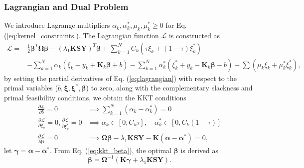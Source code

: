 \documentclass[a4paper]{cas-sc}
\begin{document}
\subsubsection{Lagrangian and Dual Problem}
We introduce Lagrange multipliers $\alpha_k, \alpha_k^*, \mu_k, \mu_k^* \ge 0$ for Eq. (\ref{eq:kernel_constraints}). The Lagrangian function $\mathcal{L}$ is constructed as
\begin{equation}
\label{eq:lagrangian}
\begin{aligned}
\mathcal{L} = &\frac{1}{2} \boldsymbol{\beta}^T \boldsymbol{\Omega} \boldsymbol{\beta} - (\lambda_1 \boldsymbol{K} \mathbf{S} \boldsymbol{Y})^T \boldsymbol{\beta} + \sum_{k=1}^N C_k (\tau \xi_k + (1-\tau)\xi_k^*) \\
&- \sum_{k=1}^N \alpha_k (\xi_k - y_k + \boldsymbol{K}_k \boldsymbol{\beta} + b) - \sum_{k=1}^N \alpha_k^* (\xi_k^* + y_k - \boldsymbol{K}_k \boldsymbol{\beta} - b) - \sum (\mu_k \xi_k + \mu_k^* \xi_k^*),
\end{aligned}
\end{equation}
by setting the partial derivatives of Eq. (\ref{eq:lagrangian}) with respect to the primal variables ($b, \boldsymbol{\xi}, \boldsymbol{\xi}^*, \boldsymbol{\beta}$) to zero, along with the complementary slackness and primal feasibility conditions, we obtain the KKT conditions
\begin{align}
    \label{eq:kkt_b} \frac{\partial \mathcal{L}}{\partial b} = 0 & \implies \sum_{k=1}^N (\alpha_k - \alpha_k^*) = 0 \\
    \label{eq:kkt_xi} \frac{\partial \mathcal{L}}{\partial \xi_k} = 0, \frac{\partial \mathcal{L}}{\partial \xi_k^*} = 0 & \implies \alpha_k \in [0, C_k \tau], \quad \alpha_k^* \in [0, C_k (1-\tau)] \\
    \label{eq:kkt_beta} \frac{\partial \mathcal{L}}{\partial \boldsymbol{\beta}} = 0 & \implies \boldsymbol{\Omega} \boldsymbol{\beta} - \lambda_1 \boldsymbol{K} \mathbf{S} \boldsymbol{Y} - \boldsymbol{K} (\boldsymbol{\alpha} - \boldsymbol{\alpha}^*) = 0,
\end{align}
let $\boldsymbol{\gamma} = \boldsymbol{\alpha} - \boldsymbol{\alpha}^*$. From Eq. (\ref{eq:kkt_beta}), the optimal $\boldsymbol{\beta}$ is derived as
\begin{equation}
\label{eq:beta_optimal}
\boldsymbol{\beta} = \boldsymbol{\Omega}^{-1} (\boldsymbol{K} \boldsymbol{\gamma} + \lambda_1 \boldsymbol{K} \mathbf{S} \boldsymbol{Y}).
\end{equation}
\end{document}
